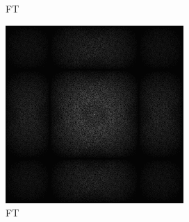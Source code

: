 \begin{figure}[H]
\begin{tcolorbox}[boxrule=4pt,sharp corners=downhill,title=Szene unter Kamerabewegung, fonttitle=\bfseries]
\begin{subfigure}[b]{0.2\linewidth}
      \caption{FT}
      \label{pic:NoTemporalRepr_3_FFT}
    \end{subfigure}
    \begin{subfigure}[b]{0.2\linewidth}
        \includegraphics[width=\linewidth]{content/TemporalerAlg/Bilder/Reprojection/NoTemporalRepr/Ausschnitte/Ausschnitt4_FFT.png}
        \caption{FT}
        \label{pic:NoTemporalRepr_4_FFT}
    \end{subfigure}
    \begin{subfigure}[b]{0.2\linewidth}

\end{subfigure}
\end{tcolorbox}
\end{figure}
